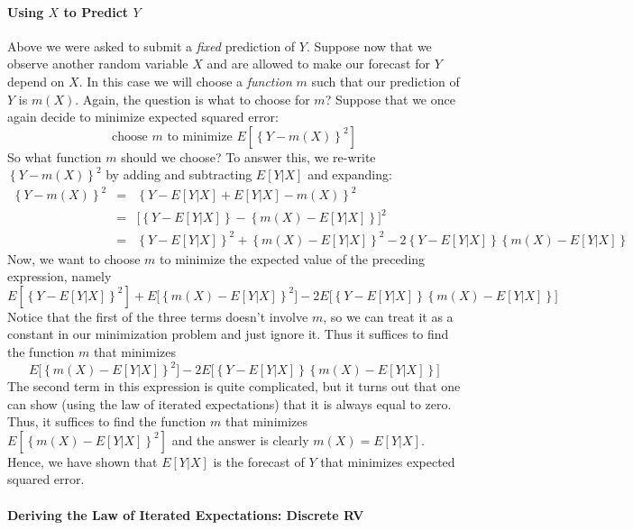 \documentclass[12pt]{article}
\begin{document}
\paragraph{Using $X$ to Predict $Y$} Above we were asked to submit a \emph{fixed} prediction of $Y$. 
Suppose now that we observe another random variable $X$ and are allowed to make our forecast for $Y$ depend on $X$.
In this case we will choose a \emph{function} $m$ such that our prediction of $Y$ is $m(X)$.
Again, the question is what to choose for $m$?
Suppose that we once again decide to minimize expected squared error:
\[
  \mbox{choose } m \mbox{ to minimize } E\left[ \left\{ Y - m(X) \right\}^2 \right]
\]
So what function $m$ should we choose?
To answer this, we re-write $\left\{ Y - m(X)\right\}^2$ by adding and subtracting $E[Y|X]$ and expanding:
\small
\begin{eqnarray*}
  \left\{ Y - m(X) \right\}^2 &=& \left\{Y - E[Y|X] + E[Y|X] - m(X) \right\}^2\\
  &=& \big[\left\{ Y - E[Y|X] \right\} - \left\{ m(X) - E[Y|X] \right\}\big]^2\\
  &=& \left\{ Y - E[Y|X] \right\}^2 + \left\{ m(X) - E[Y|X] \right\}^2 - 2\left\{ Y - E[Y|X] \right\}\left\{ m(X) - E[Y|X] \right\}
\end{eqnarray*}
\normalsize
Now, we want to choose $m$ to minimize the expected value of the preceding expression, namely
\small
\[
E\left[\left\{ Y - E[Y|X] \right\}^2\right] + E\big[\left\{ m(X) - E[Y|X] \right\}^2\big] - 2E\big[\left\{ Y - E[Y|X] \right\}\left\{ m(X) - E[Y|X] \right\}\big]
\]
\normalsize
Notice that the first of the three terms doesn't involve $m$, so we can treat it as a constant in our minimization problem and just ignore it.
Thus it suffices to find the function $m$ that minimizes 
\[
E\big[\left\{ m(X) - E[Y|X] \right\}^2\big] - 2E\big[\left\{ Y - E[Y|X] \right\}\left\{ m(X) - E[Y|X] \right\}\big]
\]
The second term in this expression is quite complicated, but it turns out that one can show (using the law of iterated expectations) that it is always equal to zero.
Thus, it suffices to find the function $m$ that minimizes $E\left[ \left\{ m(X) - E[Y|X] \right\}^2 \right]$ and the answer is clearly $m(X) = E[Y|X]$.
Hence, we have shown that $E[Y|X]$ is the forecast of $Y$ that minimizes expected squared error.


\paragraph{Deriving the Law of Iterated Expectations: Discrete RV}
\end{document}
